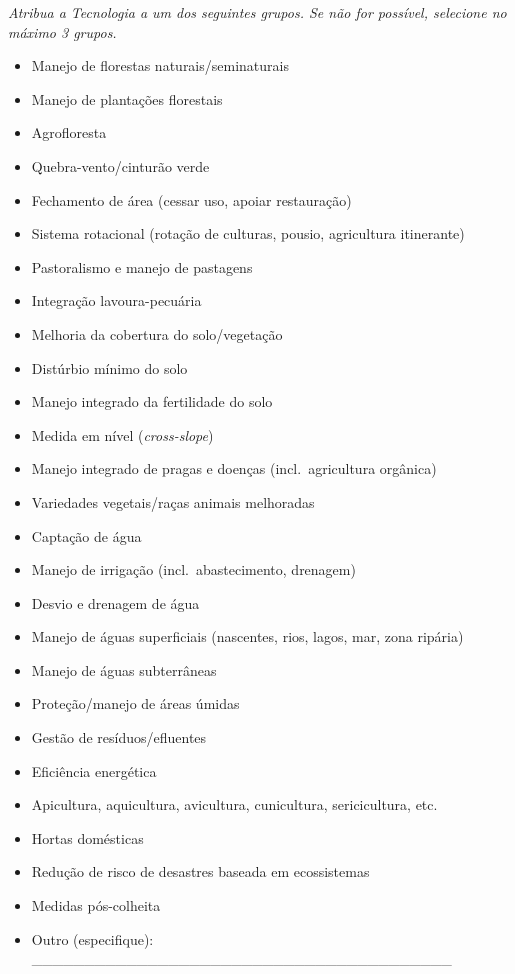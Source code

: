 \emph{Atribua a Tecnologia a um dos seguintes grupos. Se não for possível, selecione no máximo 3 grupos.}

\begin{itemize}
\tightlist
\item[$\square$]
  Manejo de florestas naturais/seminaturais
\item[$\square$]
  Manejo de plantações florestais
\item[$\square$]
  Agrofloresta
\item[$\square$]
  Quebra-vento/cinturão verde
\item[$\square$]
  Fechamento de área (cessar uso, apoiar restauração)
\item[$\square$]
  Sistema rotacional (rotação de culturas, pousio, agricultura itinerante)
\item[$\square$]
  Pastoralismo e manejo de pastagens
\item[$\square$]
  Integração lavoura-pecuária
\item[$\square$]
  Melhoria da cobertura do solo/vegetação
\item[$\square$]
  Distúrbio mínimo do solo
\item[$\square$]
  Manejo integrado da fertilidade do solo
\item[$\square$]
  Medida em nível (\emph{cross-slope})
\item[$\square$]
  Manejo integrado de pragas e doenças (incl.~agricultura orgânica)
\item[$\square$]
  Variedades vegetais/raças animais melhoradas
\item[$\square$]
  Captação de água
\item[$\square$]
  Manejo de irrigação (incl.~abastecimento, drenagem)
\item[$\square$]
  Desvio e drenagem de água
\item[$\square$]
  Manejo de águas superficiais (nascentes, rios, lagos, mar, zona ripária)
\item[$\square$]
  Manejo de águas subterrâneas
\item[$\square$]
  Proteção/manejo de áreas úmidas
\item[$\square$]
  Gestão de resíduos/efluentes
\item[$\square$]
  Eficiência energética
\item[$\square$]
  Apicultura, aquicultura, avicultura, cunicultura, sericicultura, etc.
\item[$\square$]
  Hortas domésticas
\item[$\square$]
  Redução de risco de desastres baseada em ecossistemas
\item[$\square$]
  Medidas pós-colheita
\item[$\square$]
  Outro (especifique): \_\_\_\_\_\_\_\_\_\_\_\_\_\_\_\_\_\_\_\_\_\_\_\_\_\_\_\_\_\_\_\_\_\_\_\_\_\_\_\_
\end{itemize}

